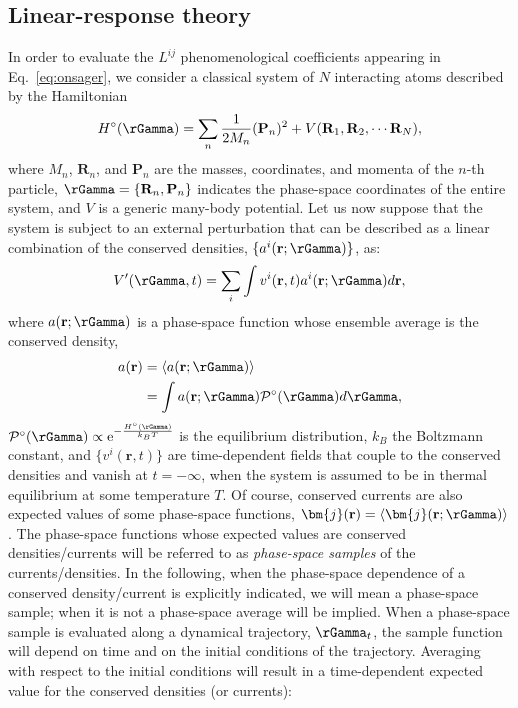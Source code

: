 \subsection{Linear-response theory}
In order to evaluate the $L^{ij}$ phenomenological coefficients appearing in Eq.~\eqref{eq:onsager}, we consider a classical system of $N$ interacting atoms described by the Hamiltonian
\begin{equation}
  H^\circ(\rGamma) = \sum_n\frac{1}{2M_n}(\mathbf{P}_n)^2 + V(\mathbf{R}_1,\mathbf{R}_2,\cdots \mathbf{R}_N), \label{eq:unperturbed_H}
\end{equation}
where $M_n$, $\mathbf{R}_n$, and $\mathbf{P}_n$ are the masses, coordinates, and momenta of the $n$-th particle, $\rGamma=\{\mathbf{R}_n,\mathbf{P}_n\}$ indicates the phase-space coordinates of the entire system, and $V$ is a generic many-body potential. Let us now suppose that the system is subject to an external perturbation that can be described as a linear combination of the conserved densities, $\{a^i(\mathbf{r};\rGamma)\}$, as:
\begin{equation}
   V'(\rGamma,t) = \sum_i \int  v^i(\mathbf{r},t) a^i(\mathbf{r};\rGamma) d\mathbf{r}, \label{eq:perturbation}
\end{equation}
where $a(\mathbf{r};\rGamma)$ is a phase-space function whose ensemble average is the conserved density,
\begin{equation}
    \begin{aligned}
      a(\mathbf{r}) &= \langle a(\mathbf{r};\rGamma) \rangle \\
      & = \int a(\mathbf{r};\rGamma) \mathcal{P}^\circ(\rGamma)d\rGamma,
    \end{aligned}
\end{equation}
$\mathcal{P}^\circ(\rGamma) \propto \mathrm{e}^{-\frac{H^\circ(\rGamma)}{k_BT}}$ is the equilibrium distribution, $k_B$ the Boltzmann constant, and $\{v^i(\mathbf{r},t)\}$ are time-dependent fields that couple to the conserved densities and vanish at $t=-\infty$, when the system is assumed to be in thermal equilibrium at some temperature $T$. Of course, conserved currents are also expected values of some phase-space functions, $\bm{j}(\mathbf{r})=\langle \bm{j}(\mathbf{r};\rGamma)\rangle$. The phase-space functions whose expected values are conserved densities/currents will be referred to as \emph{phase-space samples} of the currents/densities. In the following, when the phase-space dependence of a conserved density/current is explicitly indicated, we will mean a phase-space sample; when it is not a phase-space average will be implied. When a phase-space sample is evaluated along a dynamical trajectory, $\rGamma_t$, the sample function will depend on time and on the initial conditions of the trajectory. Averaging with respect to the initial conditions will result in a time-dependent expected value for the conserved densities (or currents):
